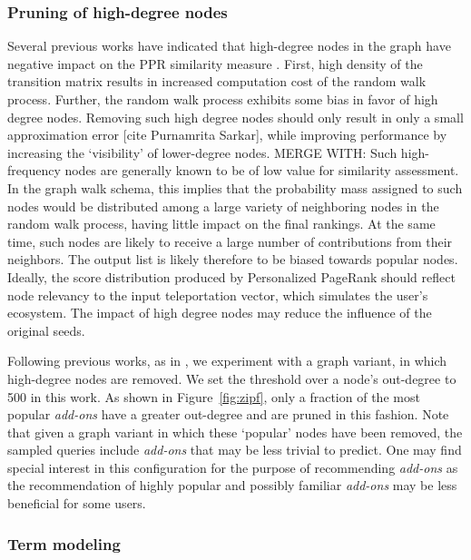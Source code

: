 \documentclass[11pt,oneside]{book}
\let\Oldsubsubsection\subsubsection
\renewcommand{\subsubsection}{\FloatBarrier\Oldsubsubsection}
\begin{document}
\subsubsection{Pruning of high-degree nodes} 

Several previous works have indicated that high-degree nodes in the graph have negative impact on the PPR similarity measure \citep{tong2006center}. First, high density of the transition matrix results in increased computation cost of the random walk process. Further, the random walk process exhibits some bias in favor of high degree nodes. Removing such high degree nodes should only result in only a small approximation error [cite Purnamrita Sarkar], while improving performance by increasing the `visibility' of lower-degree nodes. MERGE WITH: Such high-frequency nodes are generally known to be of low value for similarity assessment. In the graph walk schema, this implies that the probability mass assigned to such nodes would be distributed among a large variety of neighboring nodes in the random walk process, having little impact on the final rankings. At the same time, such nodes are likely to receive a large number of contributions from their neighbors. The output list is likely therefore to be biased towards popular nodes. Ideally, the score distribution produced by Personalized PageRank should reflect node relevancy to the input teleportation vector, which simulates the user's ecosystem. The impact of high degree nodes may reduce the influence of the original seeds.

Following previous works, as in \citep{sarkar2010fast},
we experiment with a graph variant, in which high-degree nodes are
removed. We set the threshold over a node's out-degree to 500 in this
work. As shown in Figure~\ref{fig:zipf}, only a fraction of the most popular {\it add-ons} have a greater out-degree and are pruned in this fashion. Note that given a graph variant in which these `popular' nodes have been removed, the sampled queries include {\it add-ons} that may be less trivial to predict. One may find special interest in this configuration for the purpose of recommending {\it add-ons} as the recommendation of highly popular and possibly familiar {\it add-ons} may be less beneficial for some users. 

\subsubsection{Term modeling}
\end{document}
